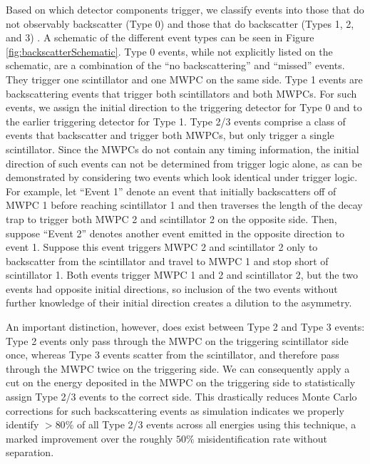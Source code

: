 Based on which detector components trigger, we classify events
into those that do not observably backscatter
(Type 0) and those that do backscatter (Types 1, 2, and 3) \cite{plaster2012}.
A schematic of the different event types can be seen in Figure \ref{fig:backscatterSchematic}.
Type 0 events, while not explicitly listed on the schematic, are a combination of the ``no
backscattering'' and ``missed'' events. They
trigger one scintillator and one MWPC on the same side. Type 1 events are
backscattering events that trigger 
both scintillators and both MWPCs. For such events, we assign the initial
direction to the triggering detector for Type 0 and to the earlier triggering detector
for Type 1. Type 2/3 events comprise a class of events that backscatter and trigger both
MWPCs, but only trigger a single scintillator. Since the MWPCs do not contain any
timing information,
the initial direction of such events can
not be determined from trigger logic alone, as can be demonstrated by considering two events
which look identical under trigger logic.
For example, let ``Event 1'' denote an event that initially backscatters off
of MWPC 1 before reaching scintillator 1
and then traverses the length of the decay
trap to trigger both MWPC 2 and scintillator 2 on the opposite side.
Then, suppose ``Event 2'' denotes another event emitted
in the opposite direction to event 1. Suppose this event
triggers MWPC 2 and scintillator 2
only to backscatter from the scintillator and travel to MWPC 1 and stop short
of scintillator 1. Both events trigger MWPC 1 and 2 and scintillator 2,
but the two events had opposite initial directions, so inclusion of the
two events without further knowledge of their initial direction creates
a dilution to the asymmetry.

An important distinction, however, does exist between Type 2 and Type 3 events:
Type 2 events only pass through the MWPC on the
triggering scintillator side once, whereas Type 3 events scatter from
the scintillator, and therefore pass through the MWPC twice on
the triggering side. We can consequently apply a cut on the energy deposited in
the MWPC on the triggering side to statistically assign
Type 2/3 events to the correct side.
This drastically reduces
Monte Carlo corrections for such backscattering events as simulation indicates we
properly identify $>80\%$ of all Type 2/3 events across all energies using this
technique, a marked
improvement over the roughly $50\%$ misidentification rate without separation.








